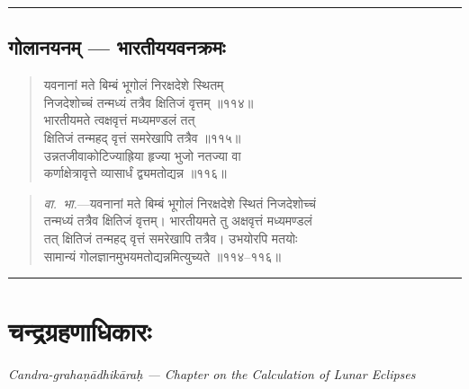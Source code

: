 \documentclass[11pt,a4paper]{article}
\newcommand{\longline}{\noindent\rule{\textwidth}{0.4pt}}
\newcommand{\dev}[1]{{\devanagarifont #1}}
\newenvironment{shloka}{%
  \begin{quote}
  \small
  \setlength{\leftmargin}{2em}
  \devanagarifont
}{\end{quote}}
\newenvironment{vyakhya}{%
  \begin{quote}
  \small
  \setlength{\leftmargin}{1em}
  \devanagarifont
}{\end{quote}}
\newcommand{\skt}[1]{{\devanagarifont #1}}
\begin{document}
\longline

\subsection{\dev{गोलानयनम् — भारतीययवनक्रमः}}

\begin{shloka}
\skt{यवनानां मते बिम्बं भूगोलं निरक्षदेशे स्थितम्}\\[0.3em]
\skt{निजदेशोच्चं तन्मध्यं तत्रैव क्षितिजं वृत्तम् ॥११४॥}\\[0.3em]
\skt{भारतीयमते त्वक्षवृत्तं मध्यमण्डलं तत्}\\[0.3em]
\skt{क्षितिजं तन्महद् वृत्तं समरेखापि तत्रैव ॥११५॥}\\[0.3em]
\skt{उन्नतजीवाकोटिज्याह्रिया हृज्या भुजो नतज्या वा}\\[0.3em]
\skt{कर्णाक्षेत्रावृत्ते व्यासार्धं द्व्यमतोद्यन्न ॥११६॥}
\end{shloka}

\begin{vyakhya}
\textit{वा.~भा.}—\skt{यवनानां मते बिम्बं भूगोलं निरक्षदेशे स्थितं निजदेशोच्चं}\\
\skt{तन्मध्यं तत्रैव क्षितिजं वृत्तम्। भारतीयमते तु अक्षवृत्तं मध्यमण्डलं}\\
\skt{तत् क्षितिजं तन्महद् वृत्तं समरेखापि तत्रैव। उभयोरपि मतयोः}\\
\skt{सामान्यं गोलज्ञानमुभयमतोद्यन्नमित्युच्यते ॥११४--११६॥}
\end{vyakhya}

\longline



\section{\dev{चन्द्रग्रहणाधिकारः}}

\begin{center}
\textit{Candra-grahaṇādhikāraḥ — Chapter on the Calculation of Lunar Eclipses}
\end{center}
\end{document}
